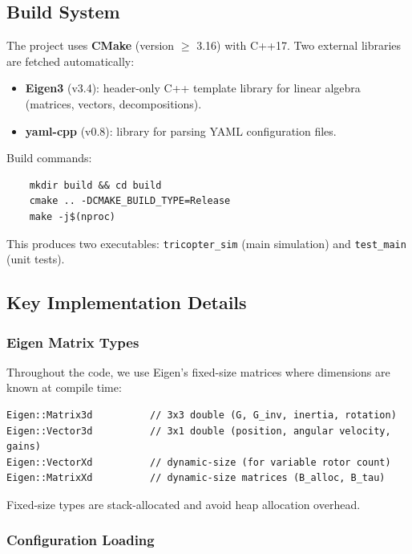 \documentclass[12pt, a4paper]{article}
\begin{document}
\subsection{Build System}

The project uses \textbf{CMake} (version $\geq$ 3.16) with C++17.  Two external libraries are fetched automatically:
\begin{itemize}
    \item \textbf{Eigen3} (v3.4): header-only C++ template library for linear algebra (matrices, vectors, decompositions).
    \item \textbf{yaml-cpp} (v0.8): library for parsing YAML configuration files.
\end{itemize}

Build commands:
\begin{verbatim}
    mkdir build && cd build
    cmake .. -DCMAKE_BUILD_TYPE=Release
    make -j$(nproc)
\end{verbatim}

This produces two executables: \texttt{tricopter\_sim} (main simulation) and \texttt{test\_main} (unit tests).

\subsection{Key Implementation Details}

\subsubsection{Eigen Matrix Types}

Throughout the code, we use Eigen's fixed-size matrices where dimensions are known at compile time:
\begin{lstlisting}[caption={Typical Eigen types used}]
Eigen::Matrix3d          // 3x3 double (G, G_inv, inertia, rotation)
Eigen::Vector3d          // 3x1 double (position, angular velocity, gains)
Eigen::VectorXd          // dynamic-size (for variable rotor count)
Eigen::MatrixXd          // dynamic-size matrices (B_alloc, B_tau)
\end{lstlisting}
Fixed-size types are stack-allocated and avoid heap allocation overhead.

\subsubsection{Configuration Loading}
\end{document}
